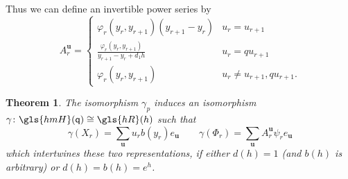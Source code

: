 \documentclass[10pt]{article}
\newtheorem{theorem}{Theorem}[section]
\theoremstyle{definition}
\newcommand{\pq}{\mathsf{q}}
\newcommand{\Bu}{\mathbf{u}}
\newcommand{\hmH}{\gls{hmH}}
\newcommand{\hR}{\gls{hR}}
\begin{document}
Thus we can define an invertible power series by \[A^{\Bu}_{r}=
\begin{cases}
 \displaystyle
\varphi_r(y_r,y_{r+1})(y_{r+1} -y_r)
& u_r =u_{r+1}\\
 \displaystyle \frac{\varphi_r(y_r,y_{r+1})}{y_{r+1}-y_r+d_1h}&
 u_r=qu_{r+1}\\
 \displaystyle \varphi_r(y_r,y_{r+1})&
 u_r\neq u_{r+1}, qu_{r+1}.
\end{cases}
\]

\begin{theorem}\label{O-isomorphism}
 The isomorphism $\gamma_p$ induces an isomorphism $\gamma\colon \hmH(\pq)\cong
 \hR(h)$ such that \[\gamma(X_r)=\sum_{\Bu}u_rb(y_r)e_{\Bu} \qquad \gamma(\Phi_r)=\sum_{\Bu}
 A_r^{\Bu}\psi_re_{\Bu}\]
 which intertwines these two representations, if either $d(h)=1$ (and
 $b(h)$ is arbitrary) or 
 $d(h)=b(h)=e^h$.
\end{theorem}
\end{document}
